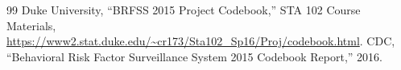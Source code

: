 \documentclass[10pt,conference,compsocconf]{IEEEtran}
\begin{document}
\begin{thebibliography}{99}
Duke University, ``BRFSS 2015 Project Codebook,'' STA 102 Course Materials, \url{https://www2.stat.duke.edu/~cr173/Sta102_Sp16/Proj/codebook.html}.
CDC, ``Behavioral Risk Factor Surveillance System 2015 Codebook Report,'' 2016.
\end{thebibliography}
\end{document}
